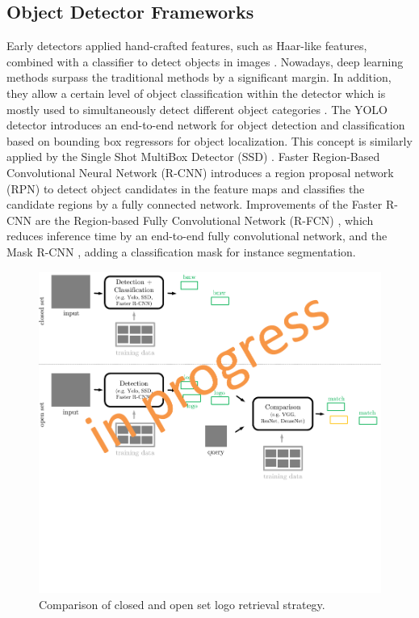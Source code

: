 \documentclass[a4paper,twoside]{article}
\begin{document}
\subsection{Object Detector Frameworks}
Early detectors applied hand-crafted features, such as Haar-like features, combined with a classifier to detect objects in images \cite{viola2004}. 
Nowadays, deep learning methods surpass the traditional methods by a significant margin. In addition, they allow a certain level of object classification within the detector which is mostly used to simultaneously detect different object categories \cite{sermanet2013}. 
The YOLO detector \cite{redmon2015} introduces an end-to-end network for object detection and classification based on bounding box regressors for object localization. This concept is similarly applied by the Single Shot MultiBox Detector (SSD) \cite{liu2015}. 
Faster Region-Based Convolutional Neural Network (R-CNN) \cite{ren2015} introduces a region proposal network (RPN) to detect object candidates in the feature maps and classifies the candidate regions by a fully connected network. 
Improvements of the Faster R-CNN are the Region-based Fully Convolutional Network (R-FCN) \cite{jifengdai2016b}, which reduces inference time by an end-to-end fully convolutional network, and the Mask R-CNN \cite{he2017}, adding a classification mask for instance segmentation.
%
\begin{figure}%
\centering%
\includegraphics[width=\linewidth, trim=0cm 5cm 0cm 0cm, clip]{img/openset.pdf}%
\caption{Comparison of closed and open set logo retrieval strategy.}%
\label{fig:openClosedSet}
\end{figure}%
\end{document}
